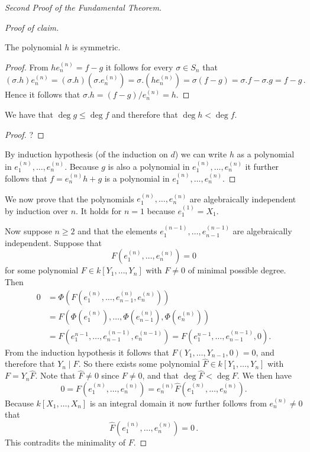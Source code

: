 \begin{proof}[Second Proof of the Fundamental Theorem]
\begin{proof}[Proof of claim]
    \begin{claim}
      The polynomial $h$ is symmetric.
    \end{claim}
    \begin{proof}
      From $h e^{(n)}_n = f-g$ it follows for every $\sigma \in S_n$ that
      \[
          (\sigma.h) e^{(n)}_n
        = (\sigma.h) (\sigma.e^{(n)}_n)
        = \sigma.(h e^{(n)}_n)
        = \sigma(f-g)
        = \sigma.f - \sigma.g
        = f - g \,.
      \]
      Hence it follows that $\sigma.h = (f-g)/e^{(n)}_n = h$.
    \end{proof}
    
    \begin{claim}
      We have that $\deg g \leq \deg f$ and therefore that $\deg h < \deg f$.
    \end{claim}
    \begin{proof}
      ?
    \end{proof}
    
    By induction hypothesis (of the induction on $d$) we can write $h$ as a polynomial in $e^{(n)}_1, \dotsc, e^{(n)}_n$.
    Because $g$ is also a polynomial in $e^{(n)}_1, \dotsc, e^{(n)}_n$ it further follows that $f = e^{(n)}_n h + g$ is a polynomial in $e^{(n)}_1, \dotsc, e^{(n)}_n$.
  \end{proof}
  
  We now prove that the polynomials $e^{(n)}_1, \dotsc, e^{(n)}_n$ are algebraically independent by induction over $n$.
  It holds for $n = 1$ because $e^{(1)}_1 = X_1$.
  
  Now suppose $n \geq 2$ and that the elements $e^{(n-1)}_1, \dotsc, e^{(n-1)}_{n-1}$ are algebraically independent.
  Suppose that
  \[
      F\left(e^{(n)}_1, \dotsc, e^{(n)}_n\right)
    = 0
  \]
  for some polynomial $F \in k[Y_1, \dotsc, Y_n]$ with $F \neq 0$ of minimal possible degree.
  Then
  \begin{align*}
        0
    &=  \Phi \left( F \left( e^{(n)}_1, \dotsc, e^{(n)}_{n-1}, e^{(n)}_n \right) \right) \\
    &=  F \left(
            \Phi\left( e^{(n)}_1 \right),
            \dotsc,
            \Phi\left( e^{(n)}_{n-1} \right),
            \Phi\left( e^{(n)}_n \right)
          \right) \\
    &=  F \left( e^{n-1}_1, \dotsc, e^{(n-1)}_{n-1}, e^{(n-1)}_n \right)
     =  F \left( e^{n-1}_1, \dotsc, e^{(n-1)}_{n-1}, 0 \right).
  \end{align*}
  From the induction hypothesis it follows that $F(Y_1, \dotsc, Y_{n-1}, 0) = 0$, and therefore that $Y_n \mid F$.
  So there exists some polynomial $\hat{F} \in k[Y_1, \dotsc, Y_n]$ with $F = Y_n \hat{F}$.
  Note that $\hat{F} \neq 0$ since $F \neq 0$, and that $\deg \hat{F}  <\deg F$.
  We then have
  \[
      0
    = F\left( e^{(n)}_1, \dotsc, e^{(n)}_n \right)
    = e^{(n)}_n \hat{F}\left( e^{(n)}_1, \dotsc, e^{(n)}_n \right).
  \]
  Because $k[X_1, \dotsc, X_n]$ is an integral domain it now further follows from $e^{(n)}_n \neq 0$ that
  \[
      \hat{F}\left( e^{(n)}_1, \dotsc, e^{(n)}_n \right)
    = 0 \,.
  \]
  This contradits the minimality of $F$.
\end{proof}



